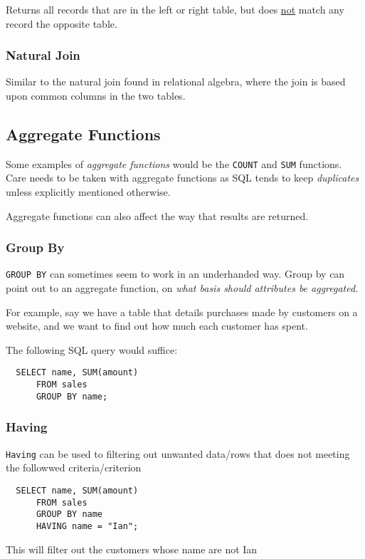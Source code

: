 \documentclass{article}
\begin{document}
Returns all records that are in the left or right table, but does \underline{not} match any record the opposite table.

\subsubsection*{Natural Join}

Similar to the natural join found in relational algebra, where the join is based upon common columns in the two tables.

\subsection{Aggregate Functions}

Some examples of \textit{aggregate functions} would be the \texttt{COUNT} and \texttt{SUM} functions. Care needs to be taken with aggregate functions as SQL tends to keep \textit{duplicates} unless explicitly mentioned otherwise.

Aggregate functions can also affect the way that results are returned.

\subsubsection*{Group By}

\texttt{GROUP BY} can sometimes seem to work in an underhanded way. Group by can point out to an aggregate function, on \textit{what basis should attributes be aggregated}.

For example, say we have a table that details purchases made by customers on a website, and we want to find out how much each customer has spent.

The following SQL query would suffice:

\begin{lstlisting}
  SELECT name, SUM(amount)
      FROM sales
      GROUP BY name;
\end{lstlisting}

\subsubsection*{Having}
\texttt{Having} can be used to filtering out unwanted data/rows that does not meeting the followwed criteria/criterion
\begin{lstlisting}
  SELECT name, SUM(amount)
      FROM sales
      GROUP BY name
      HAVING name = "Ian";
\end{lstlisting}
This will filter out the customers whose name are not Ian
\end{document}
